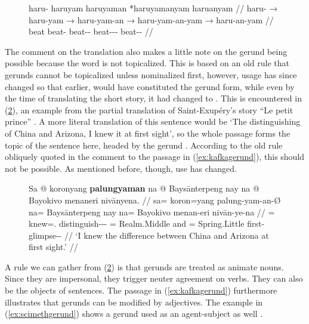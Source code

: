 \begin{figure}[h]
\ex\label{ex:datnmlz}%
\begingl
	\gla haru- {} haruyam {} haruyaman {} *haruyamanyam {} haruanyam //
	\glb haru- → haru-yam → haru-yam-an → haru-yam-an-yam → 
		haru-an-yam //
	\glc beat {} beat-\Ptcp{} {} beat-\Ptcp{}-\Nmlz{} {} 
		beat-\Ptcp{}-\Nmlz{}-\Dat{} {} beat-\Nmlz{}-\Dat{} //
\endgl\xe
\end{figure}

The comment on the translation also makes a little note on the gerund being
possible because the word is not topicalized. This is based on an old rule that
gerunds cannot be topicalized unless nominalized first, however, usage has
since changed so that earlier,  would have constituted
the gerund form, while even by the time of translating the short story, it had
changed to . This is encountered in
(\ref{ex:exuperygerund}), an example from the partial translation of
Saint-Exupéry's story \enquote{Le petit prince} \citep[3, 13]
{benung:petitprince}. A more literal translation of this sentence would be `The
distinguishing of China and Arizona, I knew it at first sight', so the whole
passage  forms the topic
of the sentence here, headed by the gerund
. According to the old rule
obliquely quoted in the comment to the passage in (\ref{ex:kafkagerund}), this
should not be possible. As mentioned before, though, use has changed.

\begin{figure}[h]
\ex\label{ex:exuperygerund}\begingl
	\gla Sa @ koronyang \textbf{palungyaman} na @ Baysānterpeng nay na @
		Bayokivo menaneri nivānyena. //
	\glb sa= koron=yang palung-yam-an-Ø na= Baysānterpeng nay na= 
		Bayokivo menan-eri nivān-ye-na //
	\glc \PatT{}= knew=\Fsg{}.\Aarg{} distinguish-\Ptcp{}-\Nmlz{}-\Top{} 
		\Gen{}= Realm.Middle and \Gen{}= Spring.Little first-\Ins{} 
		glimpse-\Pl{}-\Gen{} //
	\glft `I knew the difference between China and Arizona at first sight.' //
\endgl\xe
\end{figure}

A rule we can gather from (\ref{ex:exuperygerund}) is that gerunds are treated
as animate nouns. Since they are impersonal, they trigger neuter agreement on
verbs. They can also be the objects of sentences. The passage in
(\ref{ex:kafkagerund}) furthermore illustrates that gerunds can be modified by
adjectives. The example in (\ref{ex:scimethgerund}) shows a gerund used as an
agent-subject as well \citep{benung:scientificmethod}.

